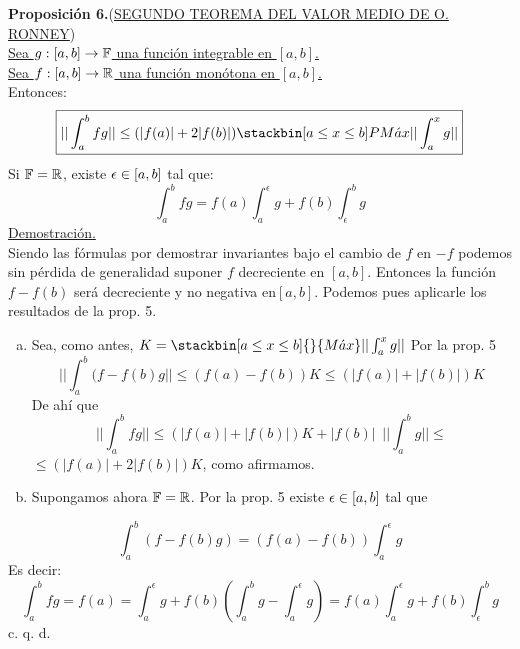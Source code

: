 \textbf{Proposición 6.}(\underline{SEGUNDO TEOREMA DEL VALOR MEDIO DE O. RONNEY})\\
\underline{Sea $g:[a,b] \rightarrow \mathbb{F}$ una función integrable en $[a,b]$.}\\
\underline{Sea $f:[a,b] \rightarrow \mathbb{R}$ una función monótona en $[a,b]$.}\\
Entonces:
\begin{equation*}
\boxed{|| \int_a ^b fg || \leq (| f(a) | + 2|f(b)|) \stackbin[a \leq x \leq b]P{}{M\acute{a}x} || \int_a ^x g ||}
\end{equation*}
Si $\mathbb{F}=\mathbb{R}$, existe $\epsilon \in [a,b]$ tal que:\\
\begin{equation*}
\boxed{\int_a ^b fg=f(a) \int_a^\epsilon g + f(b) \int_\epsilon^b g}
\end{equation*}
\underline{Demostración.}\\
Siendo las fórmulas por demostrar invariantes bajo el cambio de $f$ en $-f$ podemos sin pérdida de generalidad suponer $f$ decreciente en $[a,b]$. Entonces la función $f-f(b)$  será decreciente y no negativa en$ [a,b]$. Podemos pues aplicarle los resultados de la prop. 5.
\begin{enumerate}[a)]
\item Sea, como antes, $K=\stackbin[a \leq x \leq b]{}{M\acute{a}x} || \int_a^x g||$ 
Por la prop. 5\\
\begin{equation*}
|| \int_a^b (f-f(b) g || \leq (f(a)-f(b))K \leq (|f(a)|+|f(b)|)K
\end{equation*}
De ahí que
\begin{equation*}
|| \int_a^b fg || \leq (|f(a)|+|f(b)|)K +|f(b)| \phantom{s}||\int_{a}^b g|| \leq 
\end{equation*}
$ \leq (|f(a)| +2|f(b)|)K$, como afirmamos.
\item Supongamos ahora $\mathbb{F}=\mathbb{R}$. Por la prop. 5 existe $\epsilon \in [a,b]$ tal que
\end{enumerate}
$$\int_a^b (f-f(b)g)=(f(a)-f(b))\int_a^\epsilon g$$
Es decir:
\begin{equation*}
\int_a^bfg=f(a)=\int_a^\epsilon g+f(b)(\int_a^bg-\int_a^\epsilon g)=f(a)\int_a^\epsilon g+f(b)\int_\epsilon^bg
\end{equation*}
\hspace{11cm} c. q. d.
